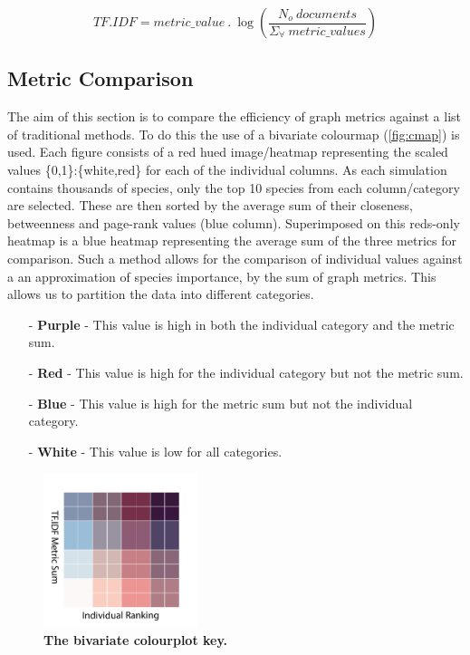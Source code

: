 \begin{equation}
    TF.IDF = metric\_value\  .\ \log(\frac{N_o\ documents}{ \Sigma_\forall\ metric\_values})
\end{equation}




\subsection{Metric Comparison}

The aim of this section is to compare the efficiency of graph metrics against a list of traditional methods. To do this the use of a bivariate colourmap (\autoref{fig:cmap}) is used. Each figure consists of a red hued image/heatmap representing the scaled values \{0,1\}:\{white,red\} for each of the individual columns. As each simulation contains thousands of species, only the top 10 species from each column/category are selected. These are then sorted by the average sum of their closeness, betweenness and page-rank values (blue column). Superimposed on this reds-only heatmap is a blue heatmap representing the average sum of the three metrics for comparison. Such a method allows for the comparison of individual values against a an approximation of species importance, by the sum of graph metrics. This allows us to partition the data into different categories. 

\begin{itemize}
\item[-] \textbf{Purple} - This value is high in both the individual category and the metric sum. 
\item[-] \textbf{Red} - This value is high for the individual category but not the metric sum. 
\item[-] \textbf{Blue} - This value is high for the metric sum but not the individual category. 
\item[-] \textbf{White} - This value is low for all categories. 
\end{itemize}



\begin{figure}[H]
     \centering
         \includegraphics[width=0.4\textwidth,angle=45]{figures_c3/mlpregressor/cbar.pdf}
        \caption{ \textbf{The bivariate colourplot key.} }
        \label{fig:cmap}
\end{figure}


